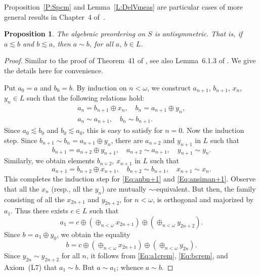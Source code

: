\documentclass[psamsfonts,reqno]{memo-l}
\theoremstyle{plain}
\newtheorem{proposition}[lemma]{Proposition}
\theoremstyle{definition}
\theoremstyle{remark}
\numberwithin{equation}{section}
\begin{document}
Proposition~\ref{P:Spcm} and Lemma~\ref{L:DelVmeas} are particular cases of
more general results in Chapter~4 of~\cite{WDim}.

\begin{proposition}\label{P:SchBern}
The algebraic preordering on $S$ is antisymmetric. That is, if $a\lesssim b$
and $b\lesssim a$, then $a\sim b$, for all $a$, $b\in L$.
\end{proposition}

\begin{proof}
Similar to the proof of Theorem~41 of \cite{Kapl68},
see also Lemma~6.1.3 of
\cite{MuNe36}. We give the details here for convenience.

Put $a_0=a$ and $b_0=b$.
By induction on $n<\omega$, we construct $a_{n+1}$, $b_{n+1}$, $x_n$,
$y_n\in L$ such that the following relations hold:
   \begin{gather}
   a_n=b_{n+1}\oplus x_n,\quad b_n=a_{n+1}\oplus y_n,\label{Eq:anbn+1}\\
   a_n\sim a_{n+1},\quad b_n\sim b_{n+1}.\label{Eq:ansiman+1}
   \end{gather}
Since $a_0\lesssim b_0$ and $b_0\lesssim a_0$, this is easy to satisfy for
$n=0$. Now the induction step. Since $b_{n+1}\sim b_n=a_{n+1}\oplus y_n$,
there are $a_{n+2}$ and $y_{n+1}$ in $L$ such that
   \[
   b_{n+1}=a_{n+2}\oplus y_{n+1},
   \quad a_{n+2}\sim a_{n+1},\quad y_{n+1}\sim y_n.
   \]
Similarly, we obtain elements $b_{n+2}$, $x_{n+1}$ in $L$ such that
   \[
   a_{n+1}=b_{n+2}\oplus x_{n+1},
   \quad b_{n+2}\sim b_{n+1},\quad x_{n+1}\sim x_n.
   \]
This completes the induction step for \eqref{Eq:anbn+1} and
\eqref{Eq:ansiman+1}. Observe that all the $x_n$ (resp., all the $y_n$) are
mutually $\sim$-equivalent. But then, the family consisting of all the
$x_{2n+1}$ and $y_{2n+2}$, for $n<\omega$, is orthogonal and majorized by
$a_1$. Thus there exists $c\in L$ such that
   \begin{equation}\label{Eq:a1crem}
   a_1=c\oplus(\oplus_{n<\omega}x_{2n+1})\oplus(\oplus_{n<\omega}y_{2n+2}).
   \end{equation}
Since $b=a_1\oplus y_0$, we obtain the equality
   \begin{equation}\label{Eq:bcrem}
   b=c\oplus(\oplus_{n<\omega}x_{2n+1})\oplus(\oplus_{n<\omega}y_{2n}).
   \end{equation}
Since $y_{2n}\sim y_{2n+2}$ for all $n$, it follows from
\eqref{Eq:a1crem}, \eqref{Eq:bcrem}, and Axiom~(L7) that $a_1\sim b$. But
$a\sim a_1$; whence $a\sim b$.
\end{proof}
\end{document}
